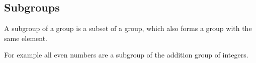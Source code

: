 
\subsection{Subgroups}

A subgroup of a group is a subset of a group, which also forms a group with the same element.

For example all even numbers are a subgroup of the addition group of integers.

